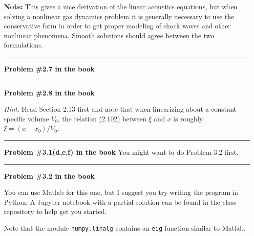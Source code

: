 \documentclass[11pt]{article}
\begin{document}
{\bf Note:} This gives a nice derivation of the linear acoustics equations,
but when solving a nonlinear gas dynamics problem it is generally necessary
to use the conservative form in order to get proper modeling of shock waves
and other nonlinear phenomena.  Smooth solutions should agree between the
two formulations.




\newpage
\vskip 1cm
\hrule
{\bf Problem \#2.7 in the book}





\vskip 1cm
\hrule
{\bf Problem \#2.8 in the book}

{\em Hint:} Read Section 2.13 first and note that when linearizing about a
constant specific volume $V_0$, the relation (2.102) between $\xi$ and $x$ is
roughly $\xi = (x-x_0)/V_0$.





\vskip 1cm
\hrule
{\bf Problem \#3.1(d,e,f) in the book} You might want to do Problem 3.2 first.





\vskip 1cm
\hrule
{\bf Problem \#3.2 in the book}

You can use Matlab for this one, but I suggest you try writing the program 
in Python.  A Jupyter notebook with a partial solution can be found in the
class repository to help get you started.

Note that the module {\tt numpy.linalg} contains an {\tt eig}
function similar to Matlab.

\end{document}

